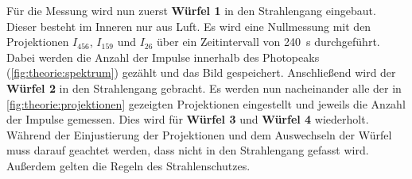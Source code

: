     Für die Messung wird nun zuerst \textbf{Würfel 1} in den Strahlengang eingebaut.
    Dieser besteht im Inneren nur aus Luft.
    Es wird eine Nullmessung mit den Projektionen $I_\text{456}$, $I_\text{159}$ und $I_\text{26}$ über ein Zeitintervall von \SI{240}{\second} durchgeführt.
    Dabei werden die Anzahl der Impulse innerhalb des Photopeaks (\autoref{fig:theorie:spektrum}) gezählt und das Bild gespeichert.
    Anschließend wird der \textbf{Würfel 2} in den Strahlengang gebracht.
    Es werden nun nacheinander alle der in \autoref{fig:theorie:projektionen} gezeigten Projektionen eingestellt und jeweils die Anzahl der Impulse gemessen.
    Dies wird für \textbf{Würfel 3} und \textbf{Würfel 4} wiederholt.
    Während der Einjustierung der Projektionen und dem Auswechseln der Würfel muss darauf geachtet werden,
    dass nicht in den Strahlengang gefasst wird.
    Außerdem gelten die Regeln des Strahlenschutzes.

